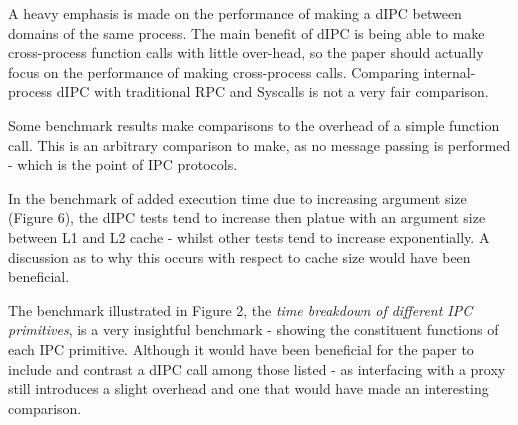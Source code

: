 \documentclass{article}
\begin{document}
A heavy emphasis is made on the performance of making a dIPC between domains of the same process. The main benefit of dIPC is being able to make cross-process function calls with little over-head, so the paper should actually focus on the performance of making cross-process calls. Comparing internal-process dIPC with traditional RPC and Syscalls is not a very fair comparison.

Some benchmark results make comparisons to the overhead of a simple function call. This is an arbitrary comparison to make, as no message passing is performed - which is the point of IPC protocols.

In the benchmark of added execution time due to increasing argument size (Figure 6), the dIPC tests tend to increase then platue with an argument size between L1 and L2 cache - whilst other tests tend to increase exponentially. A discussion as to why this occurs with respect to cache size would have been beneficial.

The benchmark illustrated in Figure 2, the \textit{time breakdown of different IPC primitives}, is a very insightful benchmark - showing the constituent functions of each IPC primitive. Although it would have been beneficial for the paper to include and contrast a dIPC call among those listed - as interfacing with a proxy still introduces a slight overhead and one that would have made an interesting comparison. 


\nocite{*}


\end{document}
